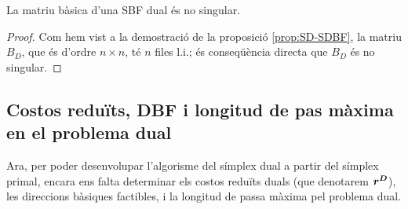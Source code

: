\begin{prop}
	La matriu bàsica d'una SBF dual és no singular.
	\begin{proof}
		Com hem vist a la demostració de la proposició \ref{prop:SD-SDBF}, la 
		matriu $B_D$, que és d'ordre $n\times n$, té $n$ files l.i.; és 
		conseqüència directa que $B_D$ és no singular.
	\end{proof}
\end{prop}

\subsection{Costos reduïts, DBF i longitud de pas màxima en el problema dual}
Ara, per poder desenvolupar l'algorisme del símplex dual a partir del símplex 
primal, encara ens falta determinar els costos reduïts duals (que denotarem 
$\boldsymbol{r^D}$), les direccions bàsiques factibles, i la longitud de passa màxima 
pel problema dual.

